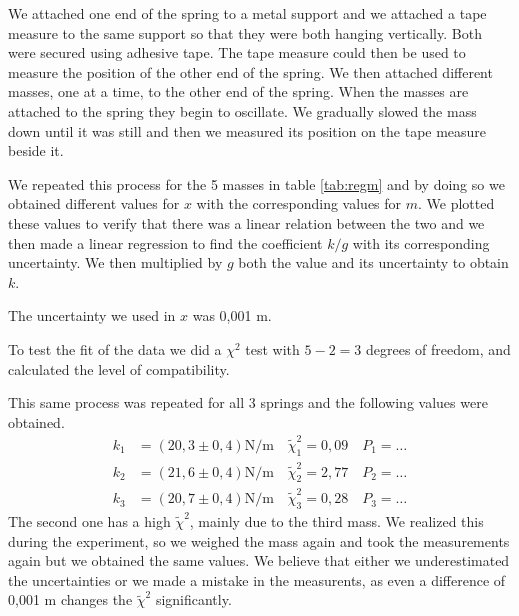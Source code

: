 \documentclass{article}
\begin{document}
We attached one end of the spring to a metal support and we attached a tape measure to the same support so that they were both hanging vertically. Both were secured using adhesive tape. The tape measure could then be used to measure the position of the other end of the spring. We then attached different masses, one at a time, to the other end of the spring. When the masses are attached to the spring they begin to oscillate. We gradually slowed the mass down until it was still and then we measured its position on the tape measure beside it. 

We repeated this process for the 5 masses in table \ref{tab:regm} and by doing so we obtained different values for $x$ with the
corresponding values for $m$. We plotted these values to verify that
there was a linear relation between the two and we then made a linear
regression to find the coefficient $k/g$ with its corresponding
uncertainty. We then multiplied by $g$ both the value and its uncertainty to obtain $k$. 

The uncertainty we used in $x$ was 0,001 m.

To test the fit of the data we did a $\chi^2$ test with $5-2 = 3$ degrees of freedom, and calculated the level of compatibility.

This same process was repeated for all 3 springs and the following values were obtained.
\begin{align}
    k_1 &= (20,3 \pm 0,4) \text{N/m} \quad \tilde \chi_1^2 = 0,09 \quad P_1 = \dots \\
    k_2 &= (21,6 \pm 0,4) \text{N/m} \quad \tilde \chi_2^2 = 2,77 \quad P_2 = \dots \\
    k_3 &= (20,7 \pm 0,4) \text{N/m} \quad \tilde \chi_3^2 = 0,28 \quad P_3 = \dots 
\end{align}
The second one has a high $\tilde \chi^2$, mainly due to the third mass. We realized this during the experiment, so we weighed the mass again and took the measurements again but we obtained the same values. We believe that either we underestimated the uncertainties or we made a mistake in the measurents, as even a difference of 0,001 m changes the $\tilde \chi^2$ significantly.
\end{document}
